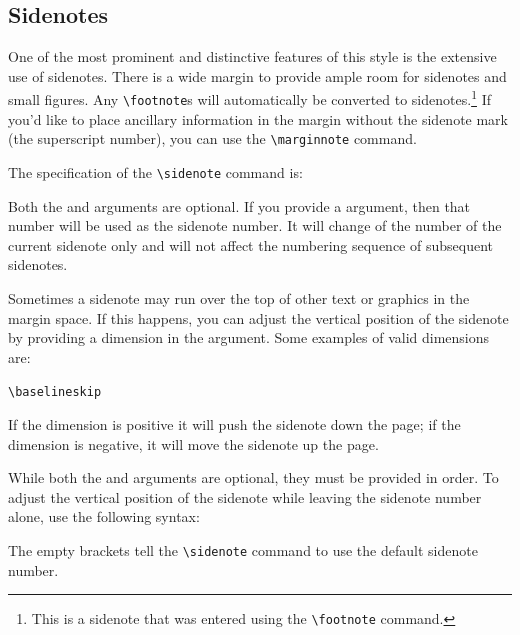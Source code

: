 \subsection{Sidenotes}\label{sec:sidenotes}
One of the most prominent and distinctive features of this style is the
extensive use of sidenotes.  There is a wide margin to provide ample room
for sidenotes and small figures.  Any \Verb|\footnote|s will automatically
be converted to sidenotes.\footnote{This is a sidenote that was entered
using the \texttt{\textbackslash footnote} command.}  If you'd like to place ancillary
information in the margin without the sidenote mark (the superscript
number), you can use the \Verb|\marginnote| command.

The specification of the \Verb|\sidenote| command is:
\begin{docspec}
\end{docspec}

Both the  and  arguments are optional.  If you
provide a  argument, then that number will be used as the
sidenote number.  It will change of the number of the current sidenote only and
will not affect the numbering sequence of subsequent sidenotes.

Sometimes a sidenote may run over the top of other text or graphics in the
margin space.  If this happens, you can adjust the vertical position of the
sidenote by providing a dimension in the  argument.  Some
examples of valid dimensions are:
\begin{docspec}
  \ttfamily 1.0in \qquad 2.54cm \qquad 254mm \Verb|\baselineskip|
\end{docspec}
If the dimension is positive it will push the sidenote down the page; if the
dimension is negative, it will move the sidenote up the page.

While both the  and  arguments are optional, they
must be provided in order.  To adjust the vertical position of the sidenote
while leaving the sidenote number alone, use the following syntax:
\begin{docspec}
\end{docspec}
The empty brackets tell the \Verb|\sidenote| command to use the default
sidenote number.

